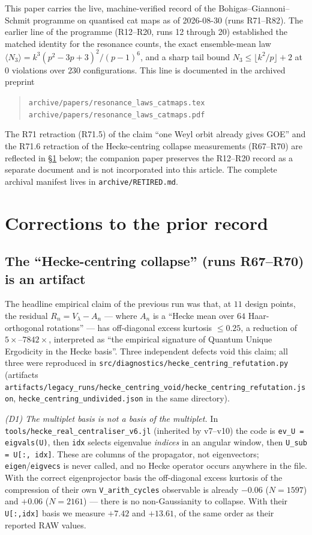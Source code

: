 \documentclass[11pt,reqno]{amsart}
\theoremstyle{definition}
\begin{document}
This paper carries the live, machine-verified record of the
Bohigas--Giannoni--Schmit programme on quantised cat maps as of
2026-08-30 (runs R71--R82). The earlier line of the programme
(R12--R20, runs 12 through 20) established the matched identity
for the resonance counts, the exact ensemble-mean law
$\langle N_3\rangle = k^3(p^2-3p+3)^2/(p-1)^6$, and a sharp tail
bound $N_3 \le \lfloor k^2/p\rfloor + 2$ at $0$ violations over
$230$ configurations. This line is documented in the archived
preprint

\begin{quote}
\texttt{archive/papers/resonance\_laws\_catmaps.tex}\\
\texttt{archive/papers/resonance\_laws\_catmaps.pdf}
\end{quote}

The R71 retraction (R71.5) of the claim ``one Weyl orbit already
gives GOE'' and the R71.6 retraction of the Hecke-centring
collapse measurements (R67--R70) are reflected in
\S\ref{sec:corrections} below; the companion paper preserves the
R12--R20 record as a separate document and is not incorporated into
this article. The complete archival manifest lives in
\texttt{archive/RETIRED.md}.


\section{Corrections to the prior record}\label{sec:corrections}

\subsection{The ``Hecke-centring collapse'' (runs R67--R70) is an artifact}
The headline empirical claim of the previous run was that, at $11$ design points,
the residual $R_n=V_\lambda-A_n$ --- where $A_n$ is a ``Hecke mean over $64$
Haar-orthogonal rotations'' --- has off-diagonal excess kurtosis $\le0.25$, a
reduction of $5\times$--$7842\times$, interpreted as ``the empirical signature of
Quantum Unique Ergodicity in the Hecke basis''. Three independent defects void
this claim; all three were reproduced in
\texttt{src/diagnostics/hecke\_centring\_refutation.py}
(artifacts \texttt{artifacts/legacy\_runs/hecke\_centring\_void/hecke\_centring\_refutation.json},
\texttt{hecke\_centring\_undivided.json} in the same directory).

\emph{(D1) The multiplet basis is not a basis of the multiplet.} In
\texttt{tools/hecke\_real\_centraliser\_v6.jl} (inherited by v7--v10) the code is
\texttt{ev\_U = eigvals(U)}, then \texttt{idx} selects eigenvalue \emph{indices}
in an angular window, then \texttt{U\_sub = U[:, idx]}. These are columns of the
propagator, not eigenvectors; \texttt{eigen}/\texttt{eigvecs} is never called, and
no Hecke operator occurs anywhere in the file. With the correct eigenprojector
basis the off-diagonal excess kurtosis of the compression of their own
\texttt{V\_arith\_cycles} observable is already $-0.06$ ($N=1597$) and $+0.06$
($N=2161$) --- there is no non-Gaussianity to collapse. With their
\texttt{U[:,idx]} basis we measure $+7.42$ and $+13.61$, of the same order as
their reported RAW values.
\end{document}
